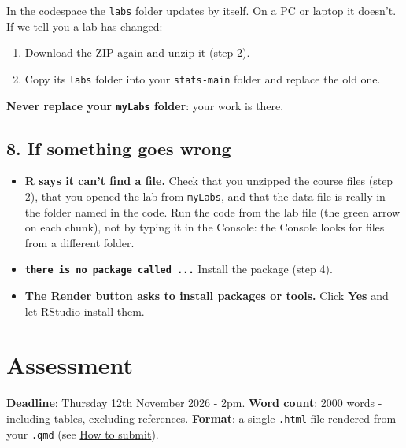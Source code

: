 \documentclass[
  letterpaper,
  DIV=11,
  numbers=noendperiod]{scrreprt}
\providecommand{\tightlist}{%
  \setlength{\itemsep}{0pt}\setlength{\parskip}{0pt}}
\begin{document}

In the codespace the \texttt{labs} folder updates by itself. On a PC or
laptop it doesn't. If we tell you a lab has changed:

\begin{enumerate}
\def\labelenumi{\arabic{enumi}.}
\tightlist
\item
  Download the ZIP again and unzip it (step 2).
\item
  Copy its \texttt{labs} folder into your \texttt{stats-main} folder and
  replace the old one.
\end{enumerate}

\textbf{Never replace your \texttt{myLabs} folder}: your work is there.

\section*{8. If something goes wrong}\label{if-something-goes-wrong-1}


\begin{itemize}
\tightlist
\item
  \textbf{R says it can't find a file.} Check that you unzipped the
  course files (step 2), that you opened the lab from \texttt{myLabs},
  and that the data file is really in the folder named in the code. Run
  the code from the lab file (the green arrow on each chunk), not by
  typing it in the Console: the Console looks for files from a different
  folder.
\item
  \textbf{\texttt{there\ is\ no\ package\ called\ ...}} Install the
  package (step 4).
\item
  \textbf{The Render button asks to install packages or tools.} Click
  \textbf{Yes} and let RStudio install them.
\end{itemize}


\chapter*{Assessment}\label{assessment}


\textbf{Deadline}: Thursday 12th November 2026 - 2pm. \textbf{Word
count}: 2000 words - including tables, excluding references.
\textbf{Format}: a single \texttt{.html} file rendered from your
\texttt{.qmd} (see \href{howSubmit.qmd}{How to submit}).
\end{document}
